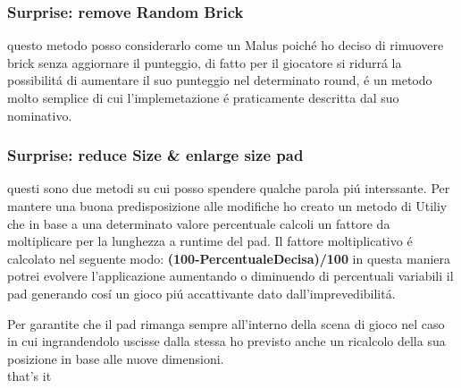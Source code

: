 \documentclass[a4paper,12pt]{report}
\begin{document}
\subsubsection{Surprise: remove Random Brick}
questo metodo posso considerarlo come un Malus poiché ho deciso di rimuovere brick senza aggiornare
il punteggio, di fatto per il giocatore si ridurrá la possibilitá di aumentare il suo punteggio nel determinato round, é
un metodo molto semplice di cui l'implemetazione é praticamente descritta dal suo nominativo.
\subsubsection{Surprise: reduce Size \& enlarge size pad}
questi sono due metodi su cui posso spendere qualche parola piú interssante.
Per mantere una buona predisposizione alle modifiche ho creato un metodo di Utiliy che in base a una determinato valore
percentuale calcoli un fattore da moltiplicare per la lunghezza a runtime del pad.
Il fattore moltiplicativo é calcolato nel seguente modo: \textbf{(100-PercentualeDecisa)/100}
in questa maniera potrei evolvere l'applicazione aumentando o diminuendo di percentuali variabili il pad
generando cosí un gioco piú accattivante dato dall'imprevedibilitá.

Per garantite che il pad rimanga sempre all'interno della scena di gioco nel caso in cui ingrandendolo uscisse
dalla stessa ho previsto anche un ricalcolo della sua posizione in base alle nuove dimensioni.
\\
that's it

\pagebreak
\end{document}

